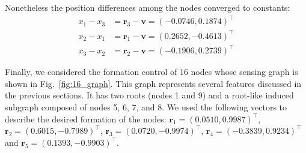 \documentclass{ifacconf}
\begin{document}
\vspace{-3mm}
%
Nonetheless the position differences among the nodes converged to constants:
\begin{equation}\nonumber
    \begin{split}
        x_1 - x_3 &= \mathbf{r}_3 - \mathbf{v} = \left(-0.0746, 0.1874 \right)^\top\\
        x_2 - x_1 &= \mathbf{r}_1 - \mathbf{v} = \left(0.2652, -0.4613 \right)^\top\\
        x_3 - x_2 &= \mathbf{r}_2 - \mathbf{v} = \left(-0.1906, 0.2739 \right)^\top
    \end{split}
\end{equation}



Finally, we considered the formation control of 16 nodes whose sensing graph is shown in Fig.~\ref{fig:16_graph}.
This graph represents several features discussed in the previous sections.
It has two roots (nodes 1 and 9) and a root-like induced subgraph composed of nodes 5, 6, 7, and 8.
We used the following vectors to describe the desired formation of the nodes:
$\mathbf{r}_1 = (0.0510, 0.9987)^\top$, $\mathbf{r}_2 = (0.6015, -0.7989)^\top$, $\mathbf{r}_3 = (0.0720, -0.9974)^\top$, $\mathbf{r}_4 = (-0.3839, 0.9234)^\top$ and $\mathbf{r}_5 = (0.1393, -0.9903)^\top$.
\end{document}
